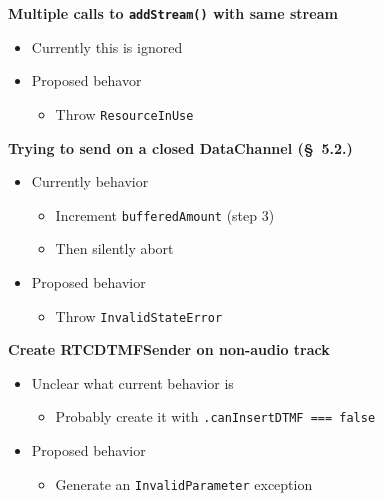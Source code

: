 \documentclass[helvetica]{seminar}
\newcommand{\heading}[1]{%
  \begin{center} 
    \large\bf 
    #1 
  \end{center} 
  \vspace{.4 in}}
\begin{document}
\begin{slide}
\heading{Multiple calls to \texttt{addStream()} with same stream}

\begin{itemize}
\item Currently this is ignored
\item Proposed behavor
  \begin{itemize}
  \item Throw \verb^ResourceInUse^
  \end{itemize}
\end{itemize}
\end{slide}

\begin{slide}
\heading{Trying to send on a closed DataChannel (\S\  5.2.)}

\begin{itemize}
\item Currently behavior
  \begin{itemize}
  \item Increment \verb^bufferedAmount^ (step 3)
  \item Then silently abort
  \end{itemize}


\item Proposed behavior
  \begin{itemize}
  \item Throw \verb^InvalidStateError^
  \end{itemize}
\end{itemize}
\end{slide}


\begin{slide}
\heading{Create RTCDTMFSender on non-audio track}

\begin{itemize}
\item Unclear what current behavior is
  \begin{itemize}
  \item Probably create it with \verb^.canInsertDTMF === false^
  \end{itemize}

\item Proposed behavior
  \begin{itemize}
  \item Generate an \verb^InvalidParameter^ exception
  \end{itemize}
  
\end{itemize}
\end{slide}
\end{document}
